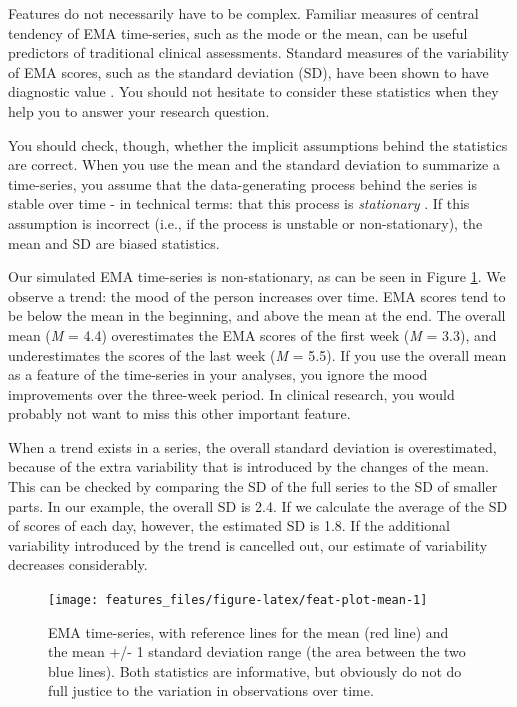 \documentclass[]{book}
\begin{document}
 

Features do not necessarily have to be complex. Familiar measures of
central tendency of EMA time-series, such as the mode or the mean, can
be useful predictors of traditional clinical assessments. Standard
measures of the variability of EMA scores, such as the standard
deviation (SD), have been shown to have diagnostic value \citep[see,
e.g.,][]{bowen2006}. You should not hesitate to consider these
statistics when they help you to answer your research question.

 You should check, though, whether the implicit
assumptions behind the statistics are correct. When you use the mean and
the standard deviation to summarize a time-series, you assume that the
data-generating process behind the series is stable over time - in
technical terms: that this process is \emph{stationary}
\citep{wikiStationary}. If this assumption is incorrect (i.e., if the
process is unstable or non-stationary), the mean and SD are biased
statistics.

Our simulated EMA time-series is non-stationary, as can be seen in
Figure \ref{fig:feat-plot-mean}. We observe a trend: the mood of the
person increases over time. EMA scores tend to be below the mean in the
beginning, and above the mean at the end. The overall mean (\emph{M} =
4.4) overestimates the EMA scores of the first week (\emph{M} = 3.3),
and underestimates the scores of the last week (\emph{M} = 5.5). If you
use the overall mean as a feature of the time-series in your analyses,
you ignore the mood improvements over the three-week period. In clinical
research, you would probably not want to miss this other important
feature.

When a trend exists in a series, the overall standard deviation is
overestimated, because of the extra variability that is introduced by
the changes of the mean. This can be checked by comparing the SD of the
full series to the SD of smaller parts. In our example, the overall SD
is 2.4. If we calculate the average of the SD of scores of each day,
however, the estimated SD is 1.8. If the additional variability
introduced by the trend is cancelled out, our estimate of variability
decreases considerably.

\begin{figure}

{\centering \texttt{[image: features\_files/figure-latex/feat-plot-mean-1]} 

}

\caption{EMA time-series, with reference lines for the mean (red line) and the mean +/- 1 standard deviation range (the area between the two blue lines). Both statistics are informative, but obviously do not do full justice to the variation in observations over time.}\label{fig:feat-plot-mean}
\end{figure}
\end{document}
